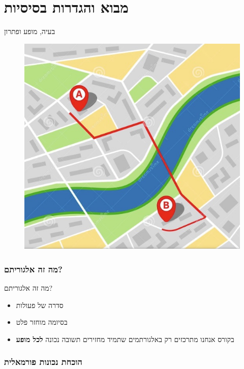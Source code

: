 \documentclass[luatex]{beamer}
\begin{document}
\part{מבוא והגדרות בסיסיות}
\frame{\partpage}
\begin{frame}{בעיה, מופע ופתרון}
\begin{figure}
	\centering
	\includegraphics[width=0.7\linewidth]{imgs/screenshot001.jpg}
\end{figure}

\end{frame}
 \section{מה זה אלגוריתם?}
\begin{frame}{מה זה אלגוריתם?}




\begin{itemize}[<+->]
	\item סדרה של פעולות
	\item בסיומה מוחזר פלט
	\item בקורס אנחנו מתרכזים רק באלגורתמים שתמיד מחזירים תשובה נכונה \textbf{לכל מופע}
\end{itemize}
\end{frame}
 \section{הוכחת נכונות פורמאלית}
\end{document}

